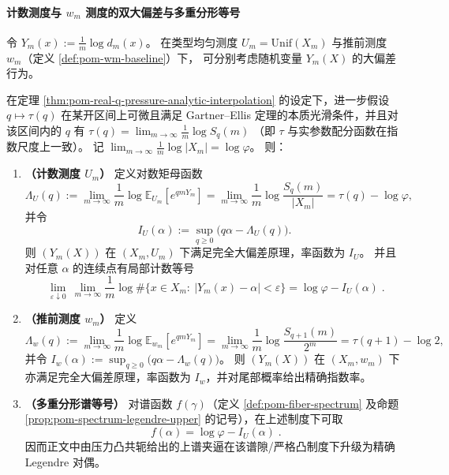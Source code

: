 \paragraph{计数测度与 \texorpdfstring{$w_m$}{wm} 测度的双大偏差与多重分形等号}
令
\(
Y_m(x):=\frac{1}{m}\log d_m(x)
\)。
在类型均匀测度 \(U_m=\mathrm{Unif}(X_m)\) 与推前测度 \(w_m\)（定义 \ref{def:pom-wm-baseline}）下，
可分别考虑随机变量 \(Y_m(X)\) 的大偏差行为。

\begin{theorem}[双版本大偏差原理与谱等号]\label{thm:pom-ldp-uniform-and-wm-exact-spectrum}
在定理 \ref{thm:pom-real-q-pressure-analytic-interpolation} 的设定下，进一步假设 \(q\mapsto \tau(q)\) 在某开区间上可微且满足 Gartner--Ellis 定理的本质光滑条件，并且对该区间内的 \(q\) 有
\(
\tau(q)=\lim_{m\to\infty}\frac{1}{m}\log S_q(m)
\)
（即 \(\tau\) 与实参数配分函数在指数尺度上一致）。
记 \(\lim_{m\to\infty}\frac{1}{m}\log|X_m|=\log\varphi\)。
则：
\begin{enumerate}
  \item \textbf{（计数测度 \(U_m\)）}
  定义对数矩母函数
  \[
  \Lambda_U(q):=\lim_{m\to\infty}\frac{1}{m}\log \mathbb{E}_{U_m}[e^{qmY_m}]
  =\lim_{m\to\infty}\frac{1}{m}\log\frac{S_q(m)}{|X_m|}
  =\tau(q)-\log\varphi,
  \]
  并令
  \[
  I_U(\alpha):=\sup_{q\ge 0}\bigl(q\alpha-\Lambda_U(q)\bigr).
  \]
  则 \((Y_m(X))\) 在 \((X_m,U_m)\) 下满足完全大偏差原理，率函数为 \(I_U\)。
  并且对任意 \(\alpha\) 的连续点有局部计数等号
  \[
  \boxed{\;
  \lim_{\varepsilon\downarrow 0}\ \lim_{m\to\infty}\frac{1}{m}\log
  \#\{x\in X_m:\ |Y_m(x)-\alpha|<\varepsilon\}
  =\log\varphi-I_U(\alpha)\; }.
  \]
  \item \textbf{（推前测度 \(w_m\)）}
  定义
  \[
  \Lambda_w(q):=\lim_{m\to\infty}\frac{1}{m}\log \mathbb{E}_{w_m}[e^{qmY_m}]
  =\lim_{m\to\infty}\frac{1}{m}\log\frac{S_{q+1}(m)}{2^m}
  =\tau(q+1)-\log 2,
  \]
  并令
  \(
  I_w(\alpha):=\sup_{q\ge 0}\bigl(q\alpha-\Lambda_w(q)\bigr)
  \)。
  则 \((Y_m(X))\) 在 \((X_m,w_m)\) 下亦满足完全大偏差原理，率函数为 \(I_w\)，并对尾部概率给出精确指数率。
  \item \textbf{（多重分形谱等号）}
  对谱函数 \(f(\gamma)\)（定义 \ref{def:pom-fiber-spectrum} 及命题 \ref{prop:pom-spectrum-legendre-upper} 的记号），在上述制度下可取
  \[
  \boxed{\;
  f(\alpha)=\log\varphi-I_U(\alpha)\; }.
  \]
  因而正文中由压力凸共轭给出的上谱夹逼在该谱隙/严格凸制度下升级为精确 Legendre 对偶。
\end{enumerate}
\end{theorem}



